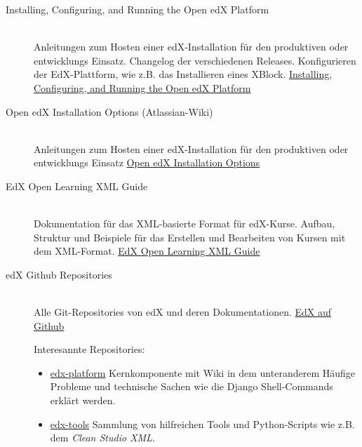 \documentclass{scrartcl}
\begin{document}
\begin{description}

\item[Installing, Configuring, and Running the Open edX Platform]\hfill \\
Anleitungen zum Hosten einer edX-Installation für den produktiven oder entwicklungs Einsatz. Changelog der verschiedenen Releases. Konfigurieren der EdX-Plattform, wie z.B. das Installieren eines XBlock.
 \href{http://edx.readthedocs.io/projects/edx-installing-configuring-and-running/en/latest/}{Installing, Configuring, and Running the Open edX Platform}

\item[Open edX Installation Options (Atlassian-Wiki)]\hfill \\
Anleitungen zum Hosten einer edX-Installation für den produktiven oder entwicklungs Einsatz
 \href{https://openedx.atlassian.net/wiki/display/OpenOPS/Open+edX+Installation+Options}{Open edX Installation Options}

\item[EdX Open Learning XML Guide]\hfill \\
Dokumentation für das XML-basierte Format für edX-Kurse. Aufbau, Struktur und Beispiele für das Erstellen und Bearbeiten von Kursen mit dem XML-Format.
 \href{http://edx.readthedocs.io/projects/edx-open-learning-xml/en/latest/}{EdX Open Learning XML Guide}

\item[edX Github Repositories]\hfill \\
Alle Git-Repositories von edX und  deren Dokumentationen.
 \href{https://github.com/edx}{EdX auf Github}

Interesannte Repositories:

\begin{itemize}
\item \href{https://github.com/edx/edx-platform/wiki}{edx-platform} Kernkomponente mit Wiki in dem unteranderem Häufige Probleme und technische Sachen wie die Django Shell-Commands erklärt werden.
\item \href{https://github.com/edx/edx-tools/wiki}{edx-tools} Sammlung von hilfreichen Tools und Python-Scripts wie z.B. dem \textit{Clean Studio XML}.
\end{itemize}

\end{description}
\end{document}
